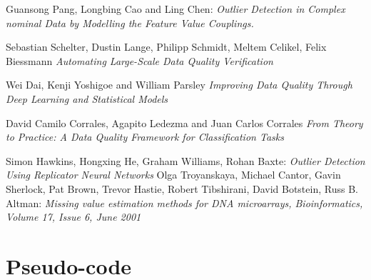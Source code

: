 \documentclass{article}
\begin{document}
\begin{thebibliography}{999}

    Guansong Pang, Longbing Cao and Ling Chen:
    \emph{Outlier Detection in Complex nominal Data
        by Modelling the Feature Value Couplings.}

    Sebastian Schelter, Dustin Lange, Philipp Schmidt, Meltem Celikel, Felix Biessmann
    \emph{Automating Large-Scale Data Quality Verification}

    Wei Dai, Kenji Yoshigoe and William Parsley
    \emph{Improving Data Quality Through Deep Learning and Statistical Models}

    David Camilo Corrales, Agapito Ledezma and Juan Carlos Corrales
    \emph{From Theory to Practice: A Data Quality Framework
        for Classification Tasks}

    Simon Hawkins, Hongxing He, Graham Williams, Rohan Baxte:
    \emph{Outlier Detection Using Replicator Neural Networks}
    Olga Troyanskaya, Michael Cantor, Gavin Sherlock, Pat Brown, Trevor Hastie, Robert Tibshirani, David Botstein, Russ B. Altman:
    \emph{Missing value estimation methods for DNA microarrays, Bioinformatics, Volume 17, Issue 6, June 2001}

\end{thebibliography}
\appendix
\section{Pseudo-code} %
\label{sec:Pseudo-code}
\end{document}
